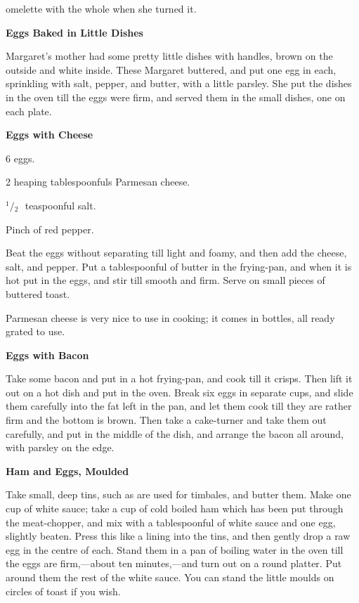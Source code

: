 \documentclass[11pt]{book}
\newcommand{\indpar}{\par\noindent\hspace*{\parindent}}
\newcommand{\ingredient}{\indpar}
\newcommand{\instruction}{\indpar}
\newcommand{\OneHalf}{\ensuremath{{}^1\!\!/\!{}_2\mbox{\ }}}
\newenvironment{RecipeTitle}{\medskip\begin{center}\large\bf }{\end{center}\smallskip}
\begin{document}
omelette with the whole when she turned it.
\begin{RecipeTitle}
Eggs Baked in Little Dishes\label{eggs_baked_in_little_dishes}
\end{RecipeTitle}
\instruction
  Margaret's mother had some pretty little dishes with handles,
brown on the outside and white inside.  These Margaret buttered,
and put one egg in each, sprinkling with salt, pepper, and butter,
with a little parsley.  She put the dishes in the oven till the eggs
were firm, and served them in the small dishes, one on each plate.
\begin{RecipeTitle}
Eggs with Cheese\label{eggs_with_cheese}
\end{RecipeTitle}
\ingredient  6 eggs.
\ingredient  2 heaping tablespoonfuls Parmesan cheese.
\ingredient  \OneHalf teaspoonful salt.
\ingredient  Pinch of red pepper.
\instruction
  Beat the eggs without separating till light and foamy, and then
add the cheese, salt, and pepper.  Put a tablespoonful of butter in
the frying-pan, and when it is hot put in the eggs, and stir till
smooth and firm.  Serve on small pieces of buttered toast.
\instruction
  Parmesan cheese is very nice to use in cooking; it comes in bottles,
all ready grated to use.
\begin{RecipeTitle}
Eggs with Bacon\label{eggs_with_bacon}
\end{RecipeTitle}
\instruction
  Take some bacon and put in a hot frying-pan, and cook till it crisps.
Then lift it out on a hot dish and put in the oven.  Break six eggs
in separate cups, and slide them carefully into the fat left in the
pan, and let them cook till they are rather firm and the bottom is
brown.  Then take a cake-turner and take them out carefully, and put
in the middle of the dish, and arrange the bacon all around, with
parsley on the edge.
\begin{RecipeTitle}
Ham and Eggs, Moulded\label{moulded_ham_and_eggs}
\end{RecipeTitle}
\instruction
  Take small, deep tins, such as are used for timbales, and butter
them.  Make one cup of white sauce; take a cup of cold boiled ham
which has been put through the meat-chopper, and mix with a
tablespoonful of white sauce and one egg, slightly beaten.  Press
this like a lining into the tins, and then gently drop a raw egg
in the centre of each.  Stand them in a pan of boiling water in the
oven till the eggs are firm,---about ten minutes,---and turn
out on a round platter.  Put around them the rest of the white sauce.
You can stand the little moulds on circles of toast if you wish.
\end{document}
